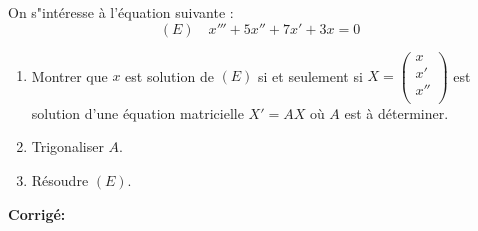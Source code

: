 \documentclass[a4paper,twoside,french,11pt]{VcCours}
\newcommand{\corr}{\textbf{Corrigé:}}
\begin{document}
\begin{Exercice}{} On s"intéresse à l'équation suivante :
$$ (E) \quad x'''+5x''+7x'+3x=0$$
\begin{enumerate}
\item Montrer que $x$ est solution de $(E)$ si et seulement si $X = \begin{pmatrix}
x \\
x' \\
x'' \\
\end{pmatrix}$ est solution d'une équation matricielle $X'=AX$ où $A$ est à déterminer.
\item Trigonaliser $A$.
\item Résoudre $(E)$.
\end{enumerate}
\end{Exercice}

\corr 
\end{document}
